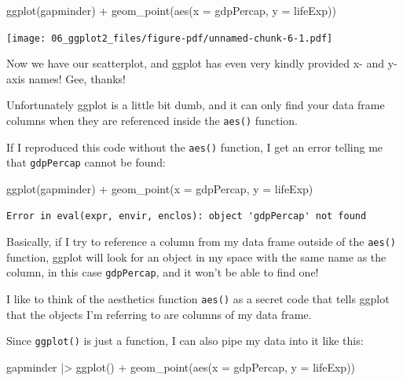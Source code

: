 \documentclass[
  letterpaper,
  DIV=11,
  numbers=noendperiod]{scrreprt}
\newenvironment{Shaded}{\begin{snugshade}}{\end{snugshade}}
\newcommand{\AttributeTok}[1]{\textcolor[rgb]{0.40,0.45,0.13}{#1}}
\newcommand{\FunctionTok}[1]{\textcolor[rgb]{0.28,0.35,0.67}{#1}}
\newcommand{\NormalTok}[1]{\textcolor[rgb]{0.00,0.23,0.31}{#1}}
\newcommand{\SpecialCharTok}[1]{\textcolor[rgb]{0.37,0.37,0.37}{#1}}
\begin{document}
\begin{Shaded}
\begin{Highlighting}[]
\FunctionTok{ggplot}\NormalTok{(gapminder) }\SpecialCharTok{+} 
  \FunctionTok{geom\_point}\NormalTok{(}\FunctionTok{aes}\NormalTok{(}\AttributeTok{x =}\NormalTok{ gdpPercap, }\AttributeTok{y =}\NormalTok{ lifeExp))}
\end{Highlighting}
\end{Shaded}

\texttt{[image: 06\_ggplot2\_files/figure-pdf/unnamed-chunk-6-1.pdf]}

Now we have our scatterplot, and ggplot has even very kindly provided x-
and y-axis names! Gee, thanks!

Unfortunately ggplot is a little bit dumb, and it can only find your
data frame columns when they are referenced inside the \texttt{aes()}
function.

If I reproduced this code without the \texttt{aes()} function, I get an
error telling me that
\texttt{\textquotesingle{}gdpPercap\textquotesingle{}} cannot be found:

\begin{Shaded}
\begin{Highlighting}[]
\FunctionTok{ggplot}\NormalTok{(gapminder) }\SpecialCharTok{+} 
  \FunctionTok{geom\_point}\NormalTok{(}\AttributeTok{x =}\NormalTok{ gdpPercap, }\AttributeTok{y =}\NormalTok{ lifeExp)}
\end{Highlighting}
\end{Shaded}

\begin{verbatim}
Error in eval(expr, envir, enclos): object 'gdpPercap' not found
\end{verbatim}

Basically, if I try to reference a column from my data frame outside of
the \texttt{aes()} function, ggplot will look for an object in my space
with the same name as the column, in this case \texttt{gdpPercap}, and
it won't be able to find one!

I like to think of the aesthetics function \texttt{aes()} as a secret
code that tells ggplot that the objects I'm referring to are columns of
my data frame.

Since \texttt{ggplot()} is just a function, I can also pipe my data into
it like this:

\begin{Shaded}
\begin{Highlighting}[]
\NormalTok{gapminder }\SpecialCharTok{|\textgreater{}} 
  \FunctionTok{ggplot}\NormalTok{() }\SpecialCharTok{+} 
  \FunctionTok{geom\_point}\NormalTok{(}\FunctionTok{aes}\NormalTok{(}\AttributeTok{x =}\NormalTok{ gdpPercap, }\AttributeTok{y =}\NormalTok{ lifeExp))}
\end{Highlighting}
\end{Shaded}
\end{document}
